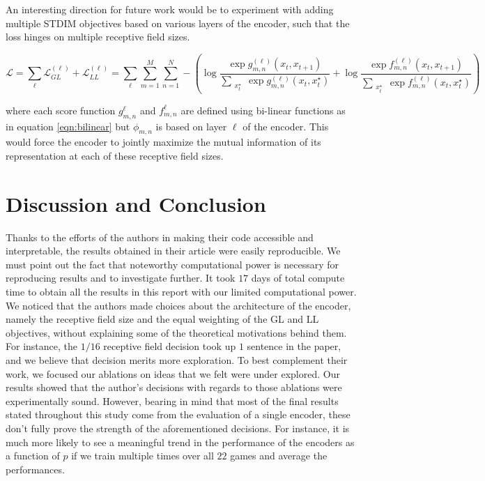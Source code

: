 \documentclass{article}
\begin{document}
An interesting direction for future work would be to experiment with adding multiple STDIM objectives based on various layers of the encoder, such that the loss hinges on multiple receptive field sizes.

\begin{equation}
\mathcal{L}=\sum_{\ell}\mathcal{L}^{(\ell)}_{GL}+\mathcal{L}^{(\ell)}_{LL}=\sum_{\ell}\sum_{m=1}^M\sum_{n=1}^N-\left(\log{\frac{\exp{g^{(\ell)}_{m,n}(x_t,x_{t+1})}}{\sum\limits_{\substack{x_t^\star}} \exp{g^{(\ell)}_{m,n}(x_t,x_t^\star)}}}+\log{\frac{\exp{f^{(\ell)}_{m,n}(x_t,x_{t+1})}}{\sum\limits_{\substack{x_t^\star}} \exp{f^{(\ell)}_{m,n}(x_t,x_t^\star)}}}\right)
\label{eqn:loss-functions-over-layers}
\end{equation}

where each score function $g^{\ell}_{m,n}$ and $f^{\ell}_{m,n}$ are defined using bi-linear functions as in equation \ref{eqn:bilinear} but $\phi_{m,n}$ is based on layer $\ell$ of the encoder. This would force the encoder to jointly maximize the mutual information of its representation at each of these receptive field sizes.

\section{Discussion and Conclusion}
Thanks to the efforts of the authors in making their code accessible and interpretable, the results obtained in their article were easily reproducible. We must point out the fact that noteworthy computational power is necessary for reproducing results and to investigate further. It took $17$ days of total compute time to obtain all the results in this report with our limited computational power.\\

We noticed that the authors made choices about the architecture of the encoder, namely the receptive field size and the equal weighting of the GL and LL objectives, without explaining some of the theoretical motivations behind them. For instance, the $1/16$ receptive field decision took up $1$ sentence in the paper, and we believe that decision merits more exploration. To best complement their work, we focused our ablations on ideas that we felt were under explored. Our results showed that the author's decisions with regards to those ablations were experimentally sound. However, bearing in mind that most of the final results stated throughout this study come from the evaluation of a single encoder, these don't fully prove the strength of the aforementioned decisions. For instance, it is much more likely to see a meaningful trend in the performance of the encoders as a function of $p$ if we train multiple times over all $22$ games and average the performances. \\
\end{document}
